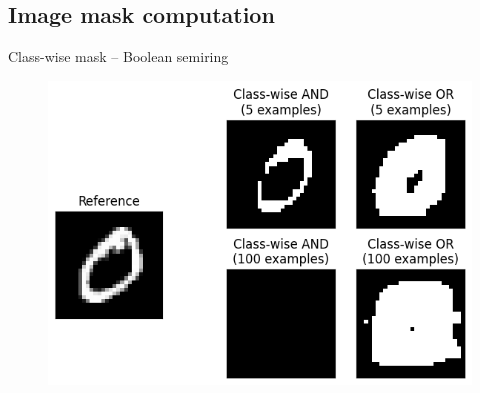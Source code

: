 \documentclass[aspectratio=169]{beamer}
\theoremstyle{definition}
\begin{document}
\subsection{Image mask computation}
\begin{frame}{Class-wise mask -- Boolean semiring}
    \begin{figure}
        \includegraphics[width=.65\textwidth]{boolean-mask.png}
    \end{figure}
\end{frame}




\end{document}
